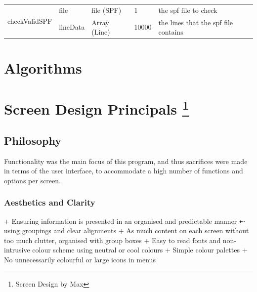 \documentclass[oneside,openany,11pt,a4paper]{report}
\begin{document}
\begin{longtable}{|p{2cm}|p{3cm}|p{2cm}|p{1cm}|p{6cm}|}
\multirow{2}{*}{\parbox{2cm}{checkValidSPF}}
& file & file (SPF) & 1 & the spf file to check \\
& lineData & Array (Line) & 10000 & the lines that the spf file contains \\ \hline
\end{longtable}
\normalsize


\section{Algorithms}



\section[Screen Design Principals]{Screen Design Principals \footnote{Screen Design by Max}}
\subsection{Philosophy}
Functionality was the main focus of this program, and thus sacrifices were made in terms of the user interface, to accommodate a high number of functions and options per screen.
\subsubsection{Aesthetics and Clarity}
+ Ensuring information is presented in an organised and predictable manner $\dashleftarrow$ using groupings and clear alignments
+ As much content on each screen without too much clutter, organised with group boxes
+ Easy to read fonts and non-intrusive colour scheme using neutral or cool colours
+ Simple colour palettes
+ No unnecessarily colourful or large icons in menus
\end{document}
